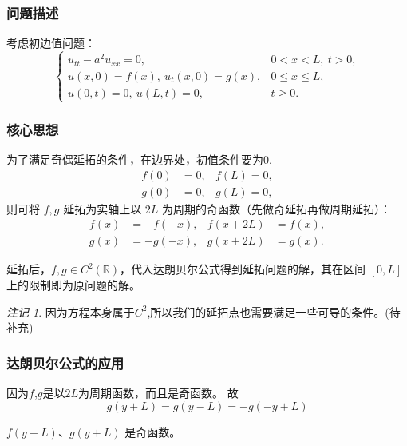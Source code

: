 \documentclass[12pt,a4paper]{article}
\numberwithin{subsection}{section}   %
\numberwithin{subsubsection}{subsection}
\theoremstyle{plain}
\theoremstyle{definition}
\theoremstyle{remark}
\newtheorem{remark}[theorem]{注记}
\theoremstyle{remark}
\begin{document}
\subsubsection{问题描述}
考虑初边值问题：
\begin{equation}
	\begin{cases}
		u_{tt} - a^2 u_{xx} = 0, & 0 < x < L, \ t > 0, \\
		u(x, 0) = f(x), \ u_t(x, 0) = g(x), & 0 \leq x \leq L, \\
		u(0, t) = 0, \ u(L, t) = 0, & t \geq 0.
	\end{cases}
\end{equation}


\subsubsection{核心思想}
为了满足奇偶延拓的条件，在边界处，初值条件要为0.
\begin{equation}
	\begin{aligned}
		f(0) & = 0, & f(L)  = 0, \\
		g(0) & =0, & g(L)  = 0,
	\end{aligned}
\end{equation}
则可将 \(f, g\) 延拓为实轴上以 \(2L\) 为周期的奇函数（先做奇延拓再做周期延拓）：
\begin{equation}
	\begin{aligned}
		f(x) &= -f(-x), & f(x + 2L) &= f(x), \\
		g(x) &= -g(-x), & g(x + 2L) &= g(x).
	\end{aligned}
\end{equation}

延拓后，\(f, g \in C^2(\mathbb{R})\)，代入达朗贝尔公式得到延拓问题的解，其在区间 \([0, L]\) 上的限制即为原问题的解。

\begin{remark}
因为方程本身属于$C^2$,所以我们的延拓点也需要满足一些可导的条件。(待补充)
\end{remark}


\subsubsection{达朗贝尔公式的应用}
因为$f$,$g$是以$2L$为周期函数，而且是奇函数。
故
\begin{equation}
g(y + L) = g(y - L) = -g(-y + L)
\end{equation}

$f(y + L)$、$g(y + L)$ 是奇函数。
\end{document}

